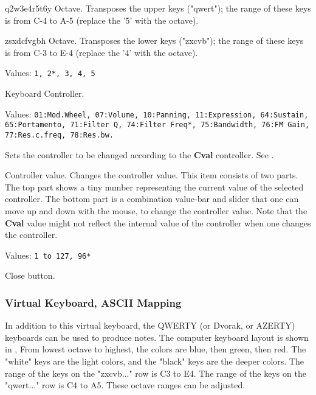    q2w3e4r5t6y Octave.
   Transposes the upper keys ("qwert"); the range of these keys is from C-4
   to A-5 (replace the '5' with the octave).

   zsxdcfvgbh Octave.
   Transposes the lower keys ("zxcvb"); the range of these keys is from C-3
   to E-4 (replace the '4' with the octave).

   Values: \texttt{1, 2*, 3, 4, 5}

   Keyboard Controller.

   Values: \texttt{01:Mod.Wheel, 07:Volume, 10:Panning,
      11:Expression, 64:Sustain, 65:Portamento, 71:Filter Q,
      74:Filter Freq*, 75:Bandwidth, 76:FM Gain,
      77:Res.c.freq, 78:Res.bw.}

   Sets the controller to be changed according to the \textbf{Cval}
   controller.
   See .

   Controller value.
   Changes the controller value.
   This item consists of two parts.  The top part shows a tiny
   number representing the current value of the selected controller.
   The bottom part is a combination value-bar and slider that one
   can move up and down with the mouse, to change the controller value.
   Note that the \textbf{Cval} value might not reflect the
   internal value of the controller when one changes the controller.

   Values: \texttt{1 to 127, 96*}

   Close button.

\subsubsection{Virtual Keyboard, ASCII Mapping}
\label{subsubsec:virtual_keyboard_ascii}

   In addition to this virtual keyboard, the QWERTY (or Dvorak, or AZERTY)
   keyboards can be used to produce notes.
   The computer keyboard layout is shown in
   ,
   From lowest octave to highest, the colors are blue, then green, then red.
   The "white" keys are the light colors, and the "black" keys are the
   deeper colors.
   The range of the keys on the "zxcvb..." row is C3 to E4.
   The range of the keys on the "qwert..." row is C4 to A5.
   These octave ranges can be adjusted.

